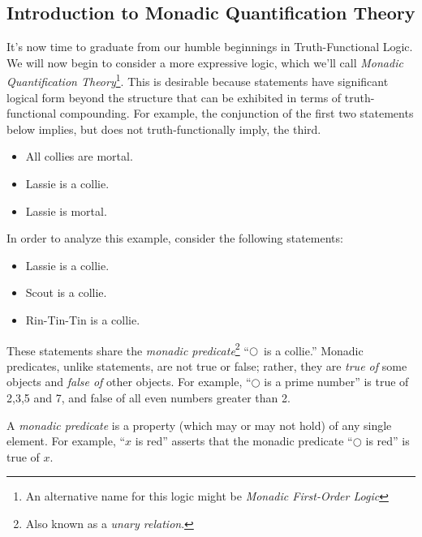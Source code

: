 \subsection{Introduction to Monadic Quantification Theory}

It's now time to graduate from our humble beginnings in Truth-Functional Logic. We will now begin to consider a more expressive logic, which we'll call \emph{Monadic Quantification Theory}\footnote{An alternative name for this logic might be \emph{Monadic First-Order Logic}}. 
This is desirable because statements have significant logical form beyond the structure that can be
exhibited in terms of truth-functional compounding. For example, the conjunction of the first two statements below implies, but does not truth-functionally imply, the third.

\begin{itemize}
\item All collies are mortal. 
\item Lassie is a collie.
\item Lassie is mortal.
\end{itemize}

In order to analyze this example, consider the following statements: 
\begin{itemize}
\item Lassie is a collie.
\item Scout is a collie.
\item Rin-Tin-Tin is a collie.
\end{itemize}

These statements share the \emph{monadic predicate}\footnote{Also known as a \emph{unary relation}.} ``$\bigcirc$\ is a collie.''
Monadic predicates, unlike statements, are not true or false; rather, they are
\emph{true of} some objects and \emph{false of} other objects.
For example, ``$\bigcirc$ is a prime number'' is true of 2,3,5 and 7, and false of all even
numbers greater than 2.

\begin{definition}
    A \emph{monadic predicate} is a property (which may or may not hold) of any single element. For example, ``$x$ is red'' asserts that the monadic predicate ``$\bigcirc$ is red'' is true of $x$. 
\end{definition}

